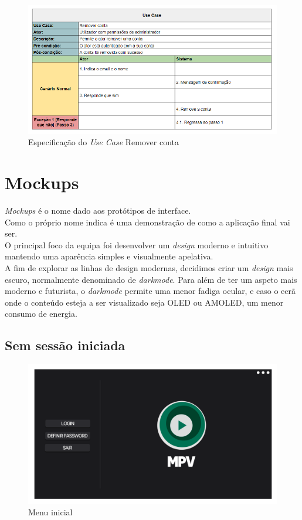 \documentclass[a4paper]{report}
\begin{document}
\begin{figure}[H]
	\centering 
    \includegraphics[width=\textwidth]{images/Remover_Conta.png}  
    \caption{Especificação do \emph{Use Case} Remover conta}
\end{figure}

\chapter{Mockups}

\textit{Mockups} é o nome dado aos protótipos de interface.\\
Como o próprio nome indica é uma demonstração de como a aplicação final vai
ser.\\
O principal foco da equipa foi desenvolver um \textit{design} moderno e
intuitivo mantendo uma aparência simples e visualmente apelativa.\\
A fim de explorar as linhas de design modernas, decidimos criar um
\textit{design} mais escuro, normalmente denominado de \textit{darkmode}. Para
além de ter um aspeto mais moderno e futurista, o \textit{darkmode} permite uma
menor fadiga ocular, e caso o ecrã onde o conteúdo esteja a ser visualizado seja
OLED ou AMOLED, um menor consumo de energia.

\section{Sem sessão iniciada}

\begin{figure}[H]
	\centering 
    \includegraphics[width=\textwidth]{images/Inicio_Menu.png}  
    \caption{Menu inicial}
\end{figure}
\end{document}
